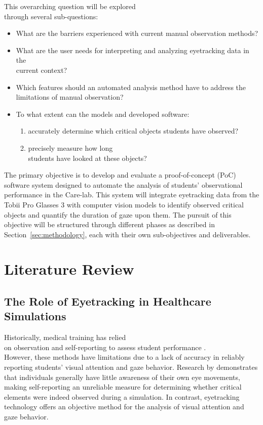 \documentclass[english]{hogent-article}
\begin{document}
This overarching question will be explored\\ through several sub-questions:
\begin{itemize}
  \item What are the barriers experienced with current manual observation methods?
  \item What are the user needs for interpreting and analyzing eyetracking data in the\\ current context?
  \item Which features should an automated analysis method have to address the limitations of manual observation?
  \item To what extent can the models and developed software:
    \begin{enumerate}
      \item accurately determine which critical objects students have observed?
      \item precisely measure how long\\ students have looked at these objects?
    \end{enumerate}
\end{itemize}

The primary objective is to develop and evaluate a proof-of-concept (PoC) software system designed to automate the analysis of students' observational performance in the Care-lab.
This system will integrate eyetracking data from the Tobii Pro Glasses 3 with computer vision models to identify observed critical objects and quantify the duration of gaze upon them.
The pursuit of this objective will be structured through different phases as described in Section~\ref{sec:methodology}, each with their own sub-objectives and deliverables.

\section{Literature Review}
\label{sec:literature-review}

\subsection{The Role of Eyetracking in Healthcare Simulations}

Historically, medical training has relied\\ on observation and self-reporting to assess student performance \autocite{Pauszek2023}.\\
However, these methods have limitations due to a lack of accuracy in reliably reporting students' visual attention and gaze behavior. 
Research by \textcite{Clarke2017} demonstrates that individuals generally have little awareness of their own eye movements, 
making self-reporting an unreliable measure for determining whether critical elements were indeed observed during a simulation. 
In contrast, eyetracking technology offers an objective method for the analysis of visual attention and gaze behavior.
\end{document}
